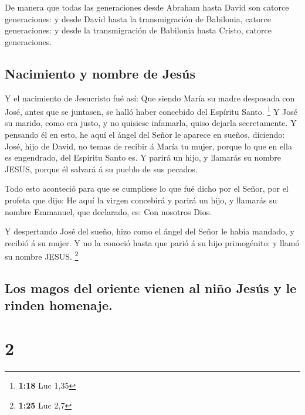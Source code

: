 De manera que todas las generaciones desde Abraham hasta
David son catorce generaciones: y desde David hasta la transmigración de
Babilonia, catorce generaciones: y desde la transmigración de Babilonia
hasta Cristo, catorce generaciones.

\hypertarget{nacimiento-y-nombre-de-jesuxfas}{%
\subsection{Nacimiento y nombre de
Jesús}\label{nacimiento-y-nombre-de-jesuxfas}}

 Y el nacimiento de Jesucristo fué así: Que siendo María su
madre desposada con José, antes que se juntasen, se halló haber
concebido del Espíritu Santo. \footnote{\textbf{1:18} Luc 1,35}
 Y José su marido, como era justo, y no quisiese infamarla,
quiso dejarla secretamente.  Y pensando él en esto, he aquí
el ángel del Señor le aparece en sueños, diciendo: José, hijo de David,
no temas de recibir á María tu mujer, porque lo que en ella es
engendrado, del Espíritu Santo es.  Y parirá un hijo, y
llamarás su nombre JESUS, porque él salvará á su pueblo de sus pecados.

 Todo esto aconteció para que se cumpliese lo que fué dicho
por el Señor, por el profeta que dijo:  He aquí la virgen
concebirá y parirá un hijo, y llamarás su nombre Emmanuel, que
declarado, es: Con nosotros Dios.

 Y despertando José del sueño, hizo como el ángel del Señor
le había mandado, y recibió á su mujer.  Y no la conoció
hasta que parió á su hijo primogénito: y llamó su nombre JESUS.
\footnote{\textbf{1:25} Luc 2,7}

\hypertarget{los-magos-del-oriente-vienen-al-niuxf1o-jesuxfas-y-le-rinden-homenaje.}{%
\subsection{Los magos del oriente vienen al niño Jesús y le rinden
homenaje.}\label{los-magos-del-oriente-vienen-al-niuxf1o-jesuxfas-y-le-rinden-homenaje.}}

\hypertarget{section-1}{%
\section{2}\label{section-1}}

